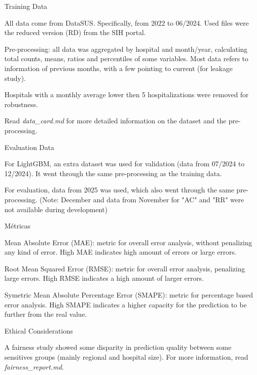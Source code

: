 \documentclass{article}
\begin{document}
\begin{singlespace}
\begin{tcolorbox}[title=\textbf{Model Card},
    breakable, sharp corners, boxrule=0.7pt]
{\begin{mcsection}{Training Data}
    \item All data come from DataSUS. Specifically, from 2022 to 06/2024. Used files were the reduced version (RD) from the SIH portal.
    \item Pre-processing: all data was aggregated by hospital and month/year, calculating total counts, means, ratios and percentiles of some variables. Most data refers to information of previous months, with a few pointing to current (for leakage study).
    \item Hospitals with a monthly average lower then 5 hospitalizations were removed for robustness.
    \item Read \textit{data\_card.md} for more detailed information on the dataset and the pre-processing.
\end{mcsection}

\begin{mcsection}{Evaluation Data}
    \item For LightGBM, an extra dataset was used for validation (data from 07/2024 to 12/2024). It went through the same pre-processing as the training data.
    \item For evaluation, data from 2025 was used, which also went through the same pre-processing. (Note: December and data from November for "AC" and "RR" were not available during development)
\end{mcsection}

\begin{mcsection}{Métricas}
    \item Mean Absolute Error (MAE): metric for overall error analysis, without penalizing any kind of error. High MAE indicates high amount of errors or large errors.
    \item Root Mean Squared Error (RMSE): metric for overall error analysis, penalizing large errors. High RMSE indicates a high amount of larger errors.
    \item Symetric Mean Absolute Percentage Error (SMAPE): metric for percentage based error analysis. High SMAPE indicates a higher capacity for the prediction to be further from the real value.
\end{mcsection}

\begin{mcsection}{Ethical Considerations}
    \item A fairness study showed some disparity in prediction quality between some sensitives groups (mainly regional and hospital size). For more information, read \textit{fairness\_report.md}.
\end{mcsection}

}
\end{tcolorbox}
\end{singlespace}
\end{document}
